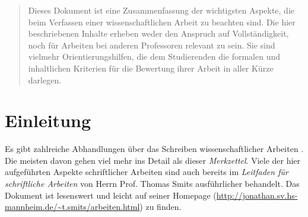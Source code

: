 \documentclass[conference,final,a4paper]{IEEEtran}
\begin{document}




\maketitle

\begin{abstract}
Dieses Dokument ist eine Zusammenfassung der wichtigsten Aspekte, die beim Verfassen einer wissenschaftlichen Arbeit zu beachten sind. Die hier beschriebenen Inhalte erheben weder den Anspruch auf Vollständigkeit, noch für Arbeiten bei anderen Professoren relevant zu sein. Sie sind vielmehr Orientierungshilfen, die dem Studierenden die formalen und inhaltlichen Kriterien für die Bewertung ihrer Arbeit in aller Kürze darlegen. 
\end{abstract}





%
\IEEEpeerreviewmaketitle



\section{Einleitung}

Es gibt zahlreiche Abhandlungen über das Schreiben wissenschaftlicher Arbeiten \cite{kraemer, kornmeier, stengel, kara, eco}. Die meisten davon gehen viel mehr ins Detail als dieser \emph{Merkzettel}. Viele der hier aufgeführten Aspekte schriftlicher Arbeiten sind auch bereits im \emph{Leitfaden für schriftliche Arbeiten} von Herrn Prof. Thomas Smits ausführlicher behandelt. Das Dokument ist lesenswert und leicht auf seiner Homepage (\url{http://jonathan.sv.hs-mannheim.de/~t.smits/arbeiten.html}) zu finden.
\end{document}
